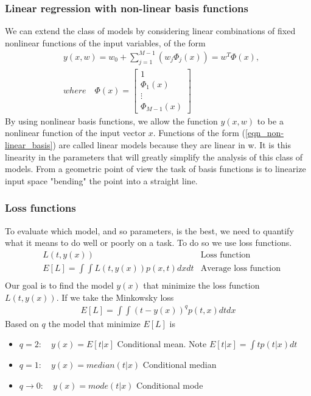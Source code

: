 \documentclass[main.tex]{subfiles}
\begin{document}
\subsubsection{Linear regression with non-linear basis functions}
We can extend the class of models by considering linear combinations of fixed nonlinear functions of the input variables, of the form
\begin{equation} \label{eqn_non-linear_basis}
    \begin{split}
        &y(x,w)=w_0+\sum_{j=1}^{M-1}(w_j\Phi_j(x))=w^T\Phi(x), \\
        & where \quad \Phi(x)=\begin{bmatrix}1\\ \Phi_1(x) \\ \vdots \\\Phi_{M-1}(x)\end{bmatrix}
    \end{split}
\end{equation}
By using nonlinear basis functions\footnotemark, we allow the function $y(x,w)$ to be a nonlinear
function of the input vector $x$. Functions of the form (\ref{eqn_non-linear_basis}) are called linear
models because they are linear in w. It is this linearity in the parameters
that will greatly simplify the analysis of this class of models. From a geometric point of view the task of basis functions is to linearize input space "bending" the point into a straight line.


\subsubsection{Loss functions}
To evaluate which model, and so parameters, is the best, we need to quantify what it means to do well or poorly on a task. To do so we use loss functions.
\begin{align*}
    &L(t,y(x)) &\text{Loss function}\\
    &E[L]=\int\int L(t,y(x))p(x,t)dxdt &\text{Average loss function}\\
\end{align*}
Our goal is to find the model $y(x)$ that minimize the loss function $L(t,y(x))$.
If we take the Minkowsky loss
\begin{equation}
    \begin{split}
        E[L]=\int \int (t-y(x))^qp(t,x)dtdx
    \end{split}
\end{equation}
Based on $q$ the model that minimize $E[L]$ is
\begin{itemize}
    \item $q=2: \quad y(x) = E[t|x]$ Conditional mean. Note $E[t|x]=\int tp(t|x)dt$
    \item $q=1: \quad y(x) = median(t|x)$ Conditional median
    \item $q\xrightarrow{}0: \quad y(x) = mode(t|x)$ Conditional mode
\end{itemize}
\end{document}
